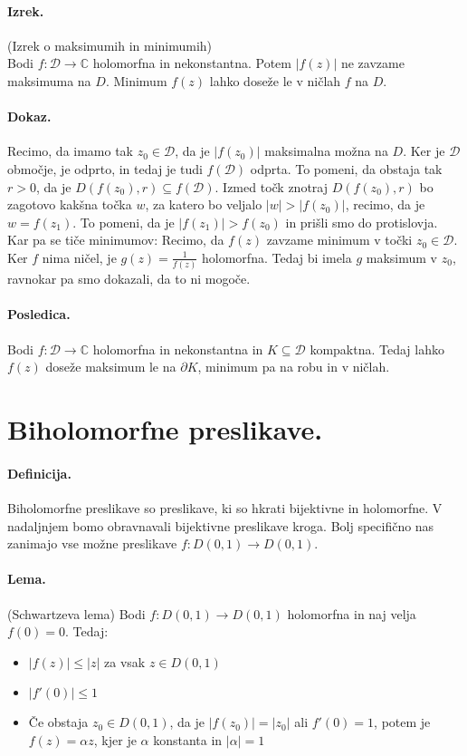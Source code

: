 \documentclass[a4paper]{article}
\newcommand{\C}{\mathbb{C}}
\newcommand{\fn}[3]{{#1}\colon {#2} \rightarrow {#3}}
\begin{document}
\paragraph{Izrek.} (Izrek o maksimumih in minimumih) \\
Bodi $\fn{f}{\mathcal{D}}{\C}$ holomorfna in nekonstantna. Potem $|f(z)|$ ne zavzame maksimuma na $D$. Minimum $f(z)$ lahko doseže le v ničlah $f$ na $D$.
\paragraph{Dokaz.} Recimo, da imamo tak $z_0\in\mathcal{D}$, da je $|f(z_0)|$ maksimalna možna na $D$.
Ker je $\mathcal{D}$ območje, je odprto, in tedaj je tudi $f(\mathcal{D})$ odprta. To pomeni, da obstaja tak $r>0$, da je $D(f(z_0), r) \subseteq f(\mathcal{D})$. Izmed točk znotraj $D(f(z_0), r)$ bo zagotovo kakšna
točka $w$, za katero bo veljalo $|w|>|f(z_0)|$, recimo, da je $w=f(z_1)$.
To pomeni, da je $|f(z_1)|>f(z_0)$ in prišli smo do protislovja. \\[4mm]
Kar pa se tiče minimumov: Recimo, da $f(z)$ zavzame minimum v točki $z_0 \in \mathcal{D}$.
Ker $f$ nima ničel, je $\displaystyle{g(z) = \frac{1}{f(z)}}$ holomorfna.
Tedaj bi imela $g$ maksimum v $z_0$, ravnokar pa smo dokazali, da to ni mogoče.
\paragraph{Posledica.} Bodi $\fn{f}{\mathcal{D}}{\C}$ holomorfna in nekonstantna in $K \subseteq \mathcal{D}$ kompaktna. Tedaj lahko $f(z)$ doseže maksimum le na $\partial K$,
minimum pa na robu in v ničlah.
\section{Biholomorfne preslikave.}
\paragraph{Definicija.} Biholomorfne preslikave so preslikave, ki so hkrati bijektivne in holomorfne.
V nadaljnjem bomo obravnavali bijektivne preslikave kroga. Bolj specifično nas zanimajo vse možne preslikave $\fn{f}{D(0, 1)}{D(0, 1)}$.
\paragraph{Lema.} (Schwartzeva lema) Bodi $\fn{f}{D(0, 1)}{D(0, 1)}$ holomorfna in naj velja $f(0)=0$.
Tedaj:
\begin{itemize}
    \item $|f(z)| \leq |z|$ za vsak $z\in D(0, 1)$
    \item $|f'(0)| \leq 1$
    \item Če obstaja $z_0 \in D(0, 1)$, da je $|f(z_0)|=|z_0|$ ali $f'(0)=1$, potem je $f(z) = \alpha z$, kjer je $\alpha$ konstanta in $|\alpha|=1$
\end{itemize}
\end{document}
